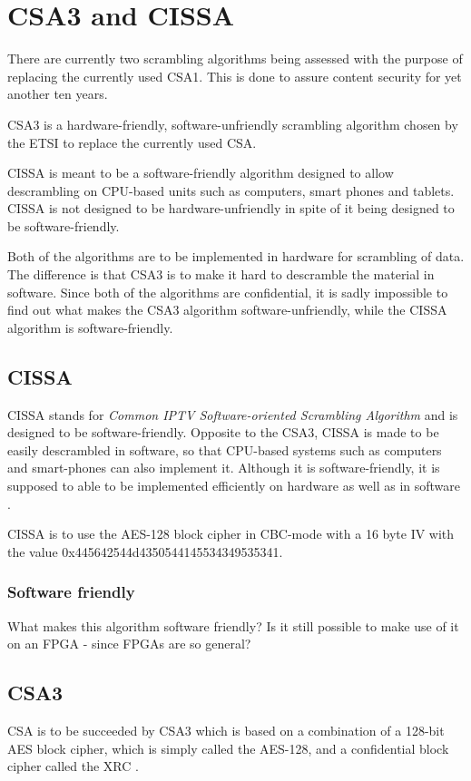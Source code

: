 \chapter{CSA3 and CISSA}
There are currently two scrambling algorithms being assessed with the purpose of 
replacing the currently used CSA1. This is done to assure content security for 
yet another ten years.

CSA3 is a hardware-friendly, software-unfriendly scrambling algorithm chosen by 
the ETSI to replace the currently used CSA. \citep[pp. 6--7]{DVB:2013}

CISSA is meant to be a software-friendly algorithm designed to allow descrambling
on CPU-based units such as computers, smart phones and tablets. CISSA is not 
designed to be hardware-unfriendly in spite of it being designed to be 
software-friendly. \citep[p. 9]{DVB:2013} 

Both of the algorithms are to be implemented in hardware for scrambling of data.
The difference is that CSA3 is to make it hard to descramble the material in 
software. Since both of the algorithms are confidential, it is sadly impossible 
to find out what makes the CSA3 algorithm software-unfriendly, while the CISSA 
algorithm is software-friendly. 

\section{CISSA}
CISSA stands for \emph{Common IPTV Software-oriented Scrambling Algorithm} and 
is designed to be software-friendly. Opposite to the CSA3, CISSA is made to be 
easily descrambled in software, so that CPU-based systems such as computers and 
smart-phones can also implement it.  Although it is software-friendly, it is 
supposed to able to be implemented efficiently on hardware as well as in 
software \citep[p. 9]{DVB:2013}.

CISSA is to use the AES-128 block cipher in CBC-mode with a 16 byte IV with the 
value 0x445642544d4350544145534349535341.

\subsection{Software friendly}
What makes this algorithm software friendly?
Is it still possible to make use of it on an FPGA - since FPGAs are so
general?

\section{CSA3}
CSA is to be succeeded by CSA3 which is based on a combination of a 128-bit 
AES block cipher, which is simply called the AES-128, and a confidential block 
cipher called the XRC \citep[p. 8]{DVB:2013}.

